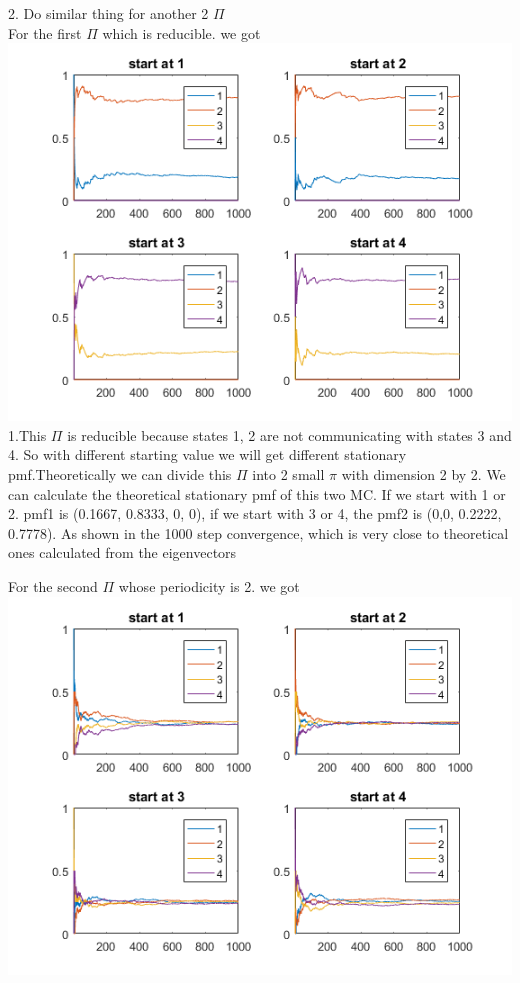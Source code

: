 \documentclass[11pt]{scrartcl}
\begin{document}
\bigskip

2. Do similar thing for another 2 $\Pi$\\
For the first $\Pi$ which is reducible. we got\\
\includegraphics[scale=1]{hw2p2.png}
1.This $\Pi$ is reducible because states 1, 2 are not communicating with states 3 and 4. So with different starting value we will get different stationary pmf.Theoretically we can divide this $\Pi$ into 2 small $\pi$ with dimension 2 by 2. We can calculate the theoretical stationary pmf of this two MC. If we start with 1 or 2. pmf1 is (0.1667, 0.8333, 0, 0), if we start with 3 or 4, the pmf2 is (0,0, 0.2222, 0.7778). As shown in the 1000 step convergence, which is very close to theoretical ones calculated from the eigenvectors\\

\bigskip

For the second $\Pi$ whose periodicity is 2. we got\\
\includegraphics[scale=1]{hw2p3.png}
\end{document}
